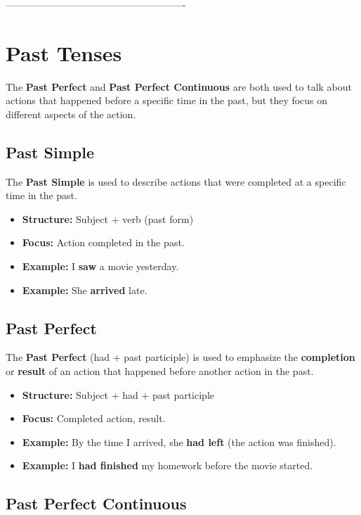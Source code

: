-------------------------------------------------------


\section{Past Tenses}

The \textbf{Past Perfect} and \textbf{Past Perfect Continuous} are both used to talk about actions that happened before a specific time in the past, but they focus on different aspects of the action.

\subsection{Past Simple}

The \textbf{Past Simple} is used to describe actions that were completed at a specific time in the past.

\begin{itemize}
    \item \textbf{Structure:} Subject + verb (past form)
    \item \textbf{Focus:} Action completed in the past.
    \item \textbf{Example:} I \textbf{saw} a movie yesterday.
    \item \textbf{Example:} She \textbf{arrived} late.
\end{itemize}

\subsection{Past Perfect}

The \textbf{Past Perfect} (had + past participle) is used to emphasize the \textbf{completion} or \textbf{result} of an action that happened before another action in the past.

\begin{itemize}
    \item \textbf{Structure:} Subject + had + past participle
    \item \textbf{Focus:} Completed action, result.
    \item \textbf{Example:} By the time I arrived, she \textbf{had left} (the action was finished).
    \item \textbf{Example:} I \textbf{had finished} my homework before the movie started.
\end{itemize}

\subsection{Past Perfect Continuous}

